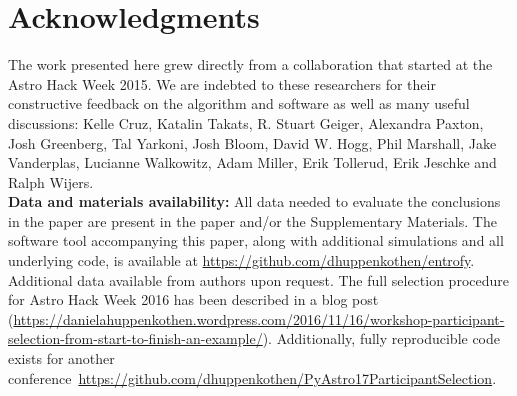 \documentclass[10pt,letterpaper]{article}
\begin{document}
\section*{Acknowledgments}
The work presented here grew directly from a collaboration that started at the Astro Hack Week 2015. %
We are indebted to these researchers for their constructive feedback on the algorithm and software as well as many useful discussions: Kelle Cruz, Katalin Takats, R. Stuart Geiger, Alexandra Paxton, Josh Greenberg, Tal Yarkoni, Josh Bloom, David W. Hogg, Phil Marshall, Jake Vanderplas, Lucianne Walkowitz, Adam Miller, Erik Tollerud, Erik Jeschke and Ralph Wijers. \\
\textbf{Data and materials availability:} All data needed to evaluate the conclusions in the paper are present in the paper and/or the Supplementary Materials. The software tool accompanying this paper, along with additional simulations and all underlying code, is available at \url{https://github.com/dhuppenkothen/entrofy}. Additional data available from authors upon request. The full selection procedure for Astro Hack Week 2016 has been described in a blog post (\url{https://danielahuppenkothen.wordpress.com/2016/11/16/workshop-participant-selection-from-start-to-finish-an-example/}). Additionally, fully reproducible code exists for another conference~\url{https://github.com/dhuppenkothen/PyAstro17ParticipantSelection}.
\end{document}
